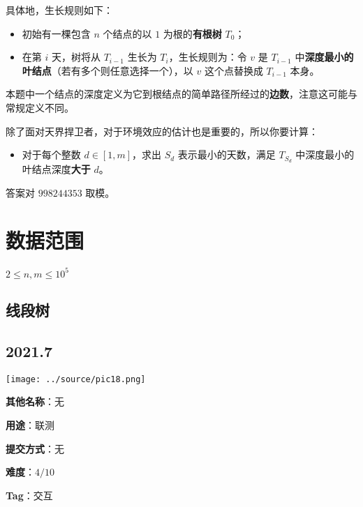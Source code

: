 \documentclass[a4paper,10pt]{article}
\begin{document}
具体地，生长规则如下：

\begin{itemize}
\item 初始有一棵包含 $n$ 个结点的以 $1$ 为根的\textbf{有根树} $T_0$；

\item 在第 $i$ 天，树将从 $T_{i-1}$ 生长为 $T_i$，生长规则为：令 $v$ 是 $T_{i-1}$ 中\textbf{深度最小的叶结点}（若有多个则任意选择一个），以 $v$ 这个点替换成 $T_{i-1}$ 本身。
\end{itemize}

本题中一个结点的深度定义为它到根结点的简单路径所经过的\textbf{边数}，注意这可能与常规定义不同。

除了面对天界捍卫者，对于环境效应的估计也是重要的，所以你要计算：

\begin{itemize}
\item 对于每个整数 $d\in [1,m]$，求出 $S_d$ 表示最小的天数，满足 $T_{S_d}$ 中深度最小的叶结点深度\textbf{大于} $d$。
\end{itemize}

答案对 $998244353$ 取模。

\section*{数据范围}

$2\leq n,m\leq 10^5$

\newpage

\vspace*{\fill}
\begin{center}

\section{线段树}

\subsection*{2021.7}

\vspace{10pt}

\texttt{[image: ../source/pic18.png]}

\vspace{10pt}

\textbf{其他名称}：无

\vspace{10pt}

\textbf{用途}：联测

\vspace{10pt}

\textbf{提交方式}：无

\vspace{10pt}

\textbf{难度}：$4/10$

\vspace{10pt}

\textbf{Tag}：交互

\end{center}
\vspace*{\fill}
\end{document}
